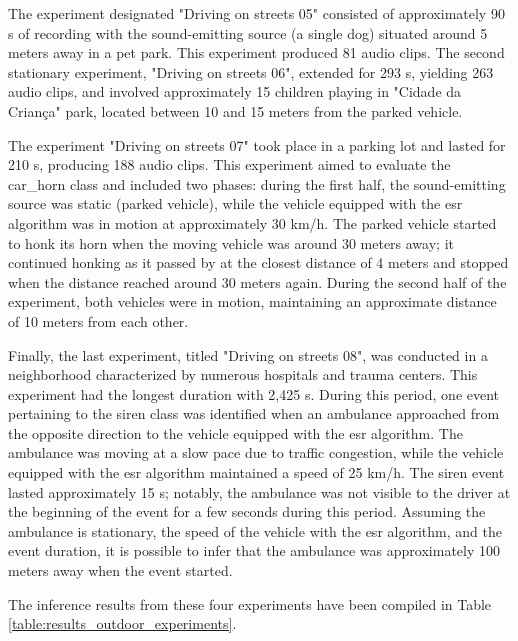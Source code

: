 The experiment designated "Driving on streets 05" consisted of approximately 90 \gls{s} of recording with the sound-emitting source (a single dog) situated around 5 meters away in a pet park. This experiment produced 81 audio clips. The second stationary experiment, "Driving on streets 06", extended for 293 \gls{s}, yielding 263 audio clips, and involved approximately 15 children playing in "Cidade da Criança" park, located between 10 and 15 meters from the parked vehicle.

The experiment "Driving on streets 07" took place in a parking lot and lasted for 210 \gls{s}, producing 188 audio clips. This experiment aimed to evaluate the car\_horn class and included two phases: during the first half, the sound-emitting source was static (parked vehicle), while the vehicle equipped with the \gls{esr} algorithm was in motion at approximately 30 km/h. The parked vehicle started to honk its horn when the moving vehicle was around 30 meters away; it continued honking as it passed by at the closest distance of 4 meters and stopped when the distance reached around 30 meters again. During the second half of the experiment, both vehicles were in motion, maintaining an approximate distance of 10 meters from each other.

Finally, the last experiment, titled "Driving on streets 08", was conducted in a neighborhood characterized by numerous hospitals and trauma centers. This experiment had the longest duration with 2,425 \gls{s}. During this period, one event pertaining to the siren class was identified when an ambulance approached from the opposite direction to the vehicle equipped with the \gls{esr} algorithm. The ambulance was moving at a slow pace due to traffic congestion, while the vehicle equipped with the \gls{esr} algorithm maintained a speed of 25 km/h. The siren event lasted approximately 15 \gls{s}; notably, the ambulance was not visible to the driver at the beginning of the event for a few seconds during this period. Assuming the ambulance is stationary, the speed of the vehicle with the \gls{esr} algorithm, and the event duration, it is possible to infer that the ambulance was approximately 100 meters away when the event started.

The inference results from these four experiments have been compiled in Table \ref{table:results_outdoor_experiments}.

